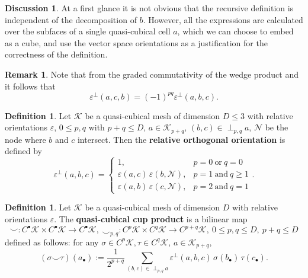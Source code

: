 \documentclass{elsarticle}
\theoremstyle{definition}
\newtheorem{definition}[theorem]{Definition}
\newtheorem{discussion}[theorem]{Discussion}
\newtheorem{remark}[theorem]{Remark}
\newcommand{\rel}{\varepsilon^\perp}
\newcommand{\newterm}[1]{\textbf{#1}}
\begin{document}
\begin{discussion}
  At a first glance it is not obvious that the recursive definition is independent of the decomposition of $b$.
  However, all the expressions are calculated over the subfaces of a single quasi-cubical cell $a$, which we can choose to embed as a cube, and use the vector space orientations as a justification for the correctness of the definition.
\end{discussion}
\begin{remark}
  Note that from the graded commutativity of the wedge product and  it follows that
  \begin{equation}
    \label{eq:discrete/exterior_calculus/perpendicular_orientations_graded_commutativity}
    \rel(a, c, b) = (-1)^{p q} \rel(a, b, c).
  \end{equation}
\end{remark}
\begin{definition}
  \label{def:discrete/exterior_calculus/perpendicular_orientations_up_to_3d}
  Let $\mathcal{K}$ be a quasi-cubical mesh of dimension $D \leq 3$ with relative orientations $\varepsilon$,
  $0 \leq p, q$ with $p + q \leq D$,
  $a \in \mathcal{K}_{p + q}$, $(b, c) \in \perp_{p, q} a$,
  $\mathcal{N}$ be the node where $b$ and $c$ intersect.
  Then the \newterm{relative orthogonal orientation} is defined by
  \begin{equation}
    \rel(a, b, c) =
    \begin{cases}
      1, & p = 0\ \text{or}\ q = 0 \\
      \varepsilon(a, c)\, \varepsilon(b, \mathcal{N}), & p = 1\ \text{and}\ q \geq 1 \\
      \varepsilon(a, b)\, \varepsilon(c, \mathcal{N}), & p = 2\ \text{and}\ q = 1
    \end{cases}.
  \end{equation}
\end{definition}
\begin{definition}
  Let $\mathcal{K}$ be a quasi-cubical mesh of dimension $D$ with relative orientations $\varepsilon$.
  The \newterm{quasi-cubical cup product} is a bilinear map
  \begin{equation}
    \smile \colon C^\bullet \mathcal{K} \times C^\bullet \mathcal{K} \to C^\bullet \mathcal{K}, \
    \smile_{p, q} \colon C^p \mathcal{K} \times C^q \mathcal{K} \to C^{p + q} \mathcal{K},\ 0 \leq p, q \leq D,\ p + q \leq D
  \end{equation}
  defined as follows: for any $\sigma \in C^p \mathcal{K}, \tau \in C^q \mathcal{K}$, $a \in \mathcal{K}_{p + q}$,
  \begin{equation}
    (\sigma \smile \tau)(a_\bullet) := \frac{1}{2^{p + q}} \sum_{(b, c) \in \perp_{p, q} a} \rel(a, b, c)\,  \sigma(b_\bullet)\, \tau(c_\bullet).
  \end{equation}
\end{definition}
\end{document}

